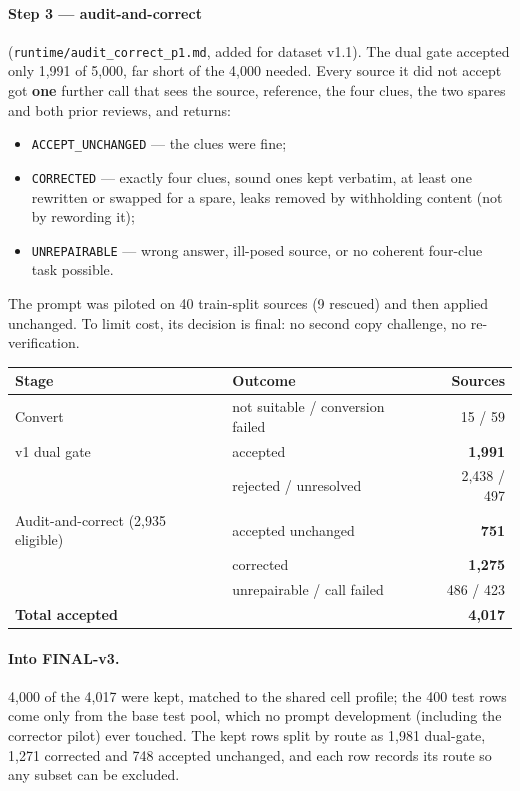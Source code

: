 \documentclass[11pt,a4paper]{article}
\newcommand{\code}[1]{\texttt{#1}}
\begin{document}
\paragraph{Step 3 --- audit-and-correct} (\code{runtime/audit\_correct\_p1.md}, added for dataset v1.1). The dual gate accepted only 1,991 of 5,000, far short of the 4,000 needed. Every source it did not accept got \textbf{one} further call that sees the source, reference, the four clues, the two spares and both prior reviews, and returns:
\begin{itemize}
\item \code{ACCEPT\_UNCHANGED} --- the clues were fine;
\item \code{CORRECTED} --- exactly four clues, sound ones kept verbatim, at least one rewritten or swapped for a spare, leaks removed by withholding content (not by rewording it);
\item \code{UNREPAIRABLE} --- wrong answer, ill-posed source, or no coherent four-clue task possible.
\end{itemize}
The prompt was piloted on 40 train-split sources (9 rescued) and then applied unchanged. To limit cost, its decision is final: no second copy challenge, no re-verification.

\begin{table}[H]
\centering\small
\begin{tabular}{@{}llr@{}}
\toprule
Stage & Outcome & Sources \\
\midrule
Convert & not suitable / conversion failed & 15 / 59 \\
v1 dual gate & accepted & \textbf{1,991} \\
 & rejected / unresolved & 2,438 / 497 \\
Audit-and-correct (2,935 eligible) & accepted unchanged & \textbf{751} \\
 & corrected & \textbf{1,275} \\
 & unrepairable / call failed & 486 / 423 \\
\midrule
\textbf{Total accepted} & & \textbf{4,017} \\
\bottomrule
\end{tabular}
\end{table}

\paragraph{Into FINAL-v3.} 4,000 of the 4,017 were kept, matched to the shared cell profile; the 400 test rows come only from the base test pool, which no prompt development (including the corrector pilot) ever touched. The kept rows split by route as 1,981 dual-gate, 1,271 corrected and 748 accepted unchanged, and each row records its route so any subset can be excluded.
\end{document}
